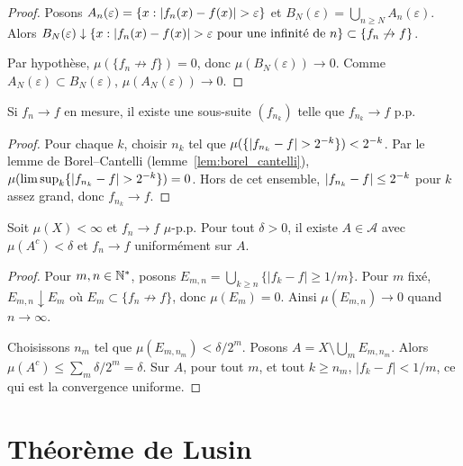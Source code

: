 \begin{proof}
Posons $A_n(\varepsilon) = \{x : \left| f_n(x) - f(x) \right| > \varepsilon\}$ et
$B_N(\varepsilon) = \bigcup_{n \geq N} A_n(\varepsilon)$. Alors
$B_N(\varepsilon) \downarrow \{x : \left| f_n(x) - f(x) \right| > \varepsilon \text{ pour
une infinit\'e de } n\} \subset \{f_n \not\to f\}$.

Par hypoth\`ese, $\mu(\{f_n \not\to f\}) = 0$, donc $\mu(B_N(\varepsilon)) \to 0$.
Comme $A_N(\varepsilon) \subset B_N(\varepsilon)$,
$\mu(A_N(\varepsilon)) \to 0$.
\end{proof}

\begin{theoreme}
Si $f_n \to f$ en mesure, il existe une sous-suite $(f_{n_k})$ telle que
$f_{n_k} \to f$ p.p.
\end{theoreme}

\begin{proof}
Pour chaque $k$, choisir $n_k$ tel que
$\mu(\{\left| f_{n_k} - f \right| > 2^{-k}\}) < 2^{-k}$. Par le lemme de Borel--Cantelli
(lemme~\ref{lem:borel_cantelli}), $\mu(\limsup_k \{\left| f_{n_k} - f \right| > 2^{-k}\})
= 0$. Hors de cet ensemble, $\left| f_{n_k} - f \right| \leq 2^{-k}$ pour $k$ assez grand,
donc $f_{n_k} \to f$.
\end{proof}

\begin{theoreme}[Egorov]
\label{thm:egorov}
Soit $\mu(X) < \infty$ et $f_n \to f$ $\mu$-p.p. Pour tout $\delta > 0$, il existe
$A \in \mathcal{A}$ avec $\mu(A^c) < \delta$ et $f_n \to f$ uniform\'ement sur $A$.
\end{theoreme}

\begin{proof}
Pour $m, n \in \mathbb{N}^*$, posons $E_{m,n} = \bigcup_{k \geq n} \{|f_k - f| \geq 1/m\}$.
Pour $m$ fix\'e, $E_{m,n} \downarrow E_m$ o\`u $E_m \subset \{f_n \not\to f\}$,
donc $\mu(E_m) = 0$. Ainsi $\mu(E_{m,n}) \to 0$ quand $n \to \infty$.

Choisissons $n_m$ tel que $\mu(E_{m,n_m}) < \delta/2^m$. Posons
$A = X \setminus \bigcup_m E_{m,n_m}$. Alors
$\mu(A^c) \leq \sum_m \delta/2^m = \delta$. Sur $A$, pour tout $m$, et tout
$k \geq n_m$, $|f_k - f| < 1/m$, ce qui est la convergence uniforme.
\end{proof}

\section{Th\'eor\`eme de Lusin}

